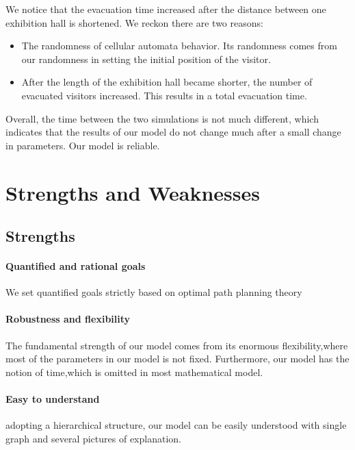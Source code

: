 We notice that the evacuation time increased after the distance between one exhibition hall is shortened. We reckon there are two reasons:


\begin{itemize}
    \item The randomness of cellular automata behavior. Its randomness comes from our randomness in setting the initial position of the visitor.
    \item After the length of the exhibition hall became shorter, the number of evacuated visitors increased. This results in a total evacuation time.
\end{itemize}

Overall, the time between the two simulations is not much different, which indicates that the results of our model do not change much after a small change in parameters. Our model is reliable.

\section{Strengths and Weaknesses}
\subsection{Strengths}
    \paragraph{Quantified and rational goals} We set quantified goals strictly based on optimal path planning theory
    \paragraph{Robustness and flexibility} The fundamental strength of our model comes from its enormous flexibility,where most of the parameters in our model is not fixed. Furthermore, our model has the notion of time,which is omitted in most mathematical model.
    \paragraph{Easy to understand} adopting a hierarchical structure, our model can be easily understood with single graph and several pictures of explanation.

